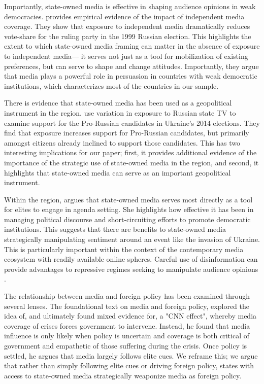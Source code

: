 \documentclass[12pt]{article}
\begin{document}
Importantly, state-owned media is effective in shaping audience opinions in weak democracies. \citet{enikolopov_media_2011} provides empirical evidence of the impact of independent media coverage. They show that exposure to independent media dramatically reduces vote-share for the ruling party in the 1999 Russian election. This highlights the extent to which state-owned media framing can matter in the absence of exposure to independent media--- it serves not just as a tool for mobilization of existing preferences, but can serve to shape and change attitudes. Importantly, they argue that media plays a powerful role in persuasion in countries with weak democratic institutions, which characterizes most of the countries in our sample. 

There is evidence that state-owned media has been used as a geopolitical instrument in the region. \citet{peisakhin_electoral_2018} use variation in exposure to Russian state TV to examine support for the Pro-Russian candidates in Ukraine's 2014 elections. They find that exposure increases support for Pro-Russian candidates, but primarily amongst citizens already inclined to support those candidates. This has two interesting implications for our paper; first, it provides additional evidence of the importance of the strategic use of state-owned media in the region, and second, it highlights that state-owned media can serve as an important geopolitical instrument.

Within the region, \citet{oates_television_2006} argues that state-owned media serves most directly as a tool for elites to engage in agenda setting. She highlights how effective it has been in managing political discourse and short-circuiting efforts to promote democratic institutions. This suggests that there are benefits to state-owned media strategically manipulating sentiment around an event like the invasion of Ukraine. This is particularly important within the context of the contemporary media ecosystem with readily available online spheres. Careful use of disinformation can provide advantages to repressive regimes seeking to manipulate audience opinions \citep{oates_russian_2016}.

The relationship between media and foreign policy has been examined through several lenses. The foundational text on media and foreign policy, \citet{robinson_cnn_2002} explored the idea of, and ultimately found mixed evidence for, a "CNN effect", whereby media coverage of crises forces government to intervene. Instead, he found that media influence is only likely when policy is uncertain and coverage is both critical of government and empathetic of those suffering during the crisis. Once policy is settled, he argues that media largely follows elite cues. We reframe this; we argue that rather than simply following elite cues or driving foreign policy, states with access to state-owned media strategically weaponize media as foreign policy.
\end{document}
